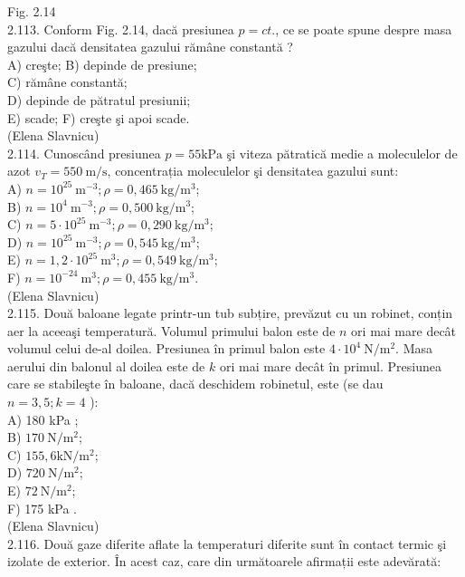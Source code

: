 \documentclass[10pt]{article}
\begin{document}
Fig. 2.14\\
2.113. Conform Fig. 2.14, dacă presiunea $p=c t$., ce se poate spune despre masa gazului dacă densitatea gazului rămâne constantă ?\\
A) creşte; B) depinde de presiune;\\
C) rămâne constantă;\\
D) depinde de pătratul presiunii;\\
E) scade; F) creşte şi apoi scade.\\
(Elena Slavnicu)\\
2.114. Cunoscând presiunea $p=55 \mathrm{kPa}$ şi viteza pătratică medie a moleculelor de azot $v_{T}=550 \mathrm{~m} / \mathrm{s}$, concentrația moleculelor şi densitatea gazului sunt:\\
A) $n=10^{25} \mathrm{~m}^{-3} ; \rho=0,465 \mathrm{~kg} / \mathrm{m}^{3}$;\\
B) $n=10^{4} \mathrm{~m}^{-3} ; \rho=0,500 \mathrm{~kg} / \mathrm{m}^{3}$;\\
C) $n=5 \cdot 10^{25} \mathrm{~m}^{-3} ; \rho=0,290 \mathrm{~kg} / \mathrm{m}^{3}$;\\
D) $n=10^{25} \mathrm{~m}^{-3} ; \rho=0,545 \mathrm{~kg} / \mathrm{m}^{3}$;\\
E) $n=1,2 \cdot 10^{25} \mathrm{~m}^{3} ; \rho=0,549 \mathrm{~kg} / \mathrm{m}^{3}$;\\
F) $n=10^{-24} \mathrm{~m}^{3} ; \rho=0,455 \mathrm{~kg} / \mathrm{m}^{3}$.\\
(Elena Slavnicu)\\
2.115. Două baloane legate printr-un tub subțire, prevăzut cu un robinet, conțin aer la aceeaşi temperatură. Volumul primului balon este de $n$ ori mai mare decât volumul celui de-al doilea. Presiunea în primul balon este $4 \cdot 10^{4} \mathrm{~N} / \mathrm{m}^{2}$. Masa aerului din balonul al doilea este de $k$ ori mai mare decât în primul. Presiunea care se stabileşte în baloane, dacă deschidem robinetul, este (se dau $n=3,5 ; k=4$ ):\\
A) 180 kPa ;\\
B) $170 \mathrm{~N} / \mathrm{m}^{2}$;\\
C) $155,6 \mathrm{kN} / \mathrm{m}^{2}$;\\
D) $720 \mathrm{~N} / \mathrm{m}^{2}$;\\
E) $72 \mathrm{~N} / \mathrm{m}^{2}$;\\
F) 175 kPa .\\
(Elena Slavnicu)\\
2.116. Două gaze diferite aflate la temperaturi diferite sunt în contact termic şi izolate de exterior. În acest caz, care din următoarele afirmații este adevărată:\\
\end{document}

